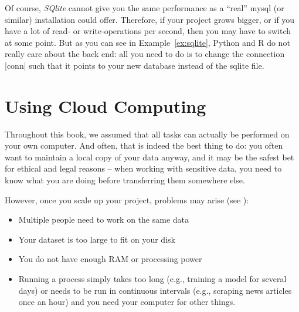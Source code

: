 
Of course, \emph{SQlite} cannot give you the same performance as a ``real'' mysql (or similar) installation could offer. Therefore, if your project grows bigger, or if you have a lot of read-
 or
write-operations per second, then you may have to switch at some
point. But as you can see in Example~\ref{ex:sqlite}, Python and R do not
really care about the back end: all you need to do is to change the
connection |conn| such that it points to your new database instead of
the sqlite file.


%

\section{Using Cloud Computing}
\label{sec:cloudcomputing}

Throughout this book, we assumed that all tasks can actually be
performed on your own computer. And often, that is indeed the best
thing to do: you often want to maintain a local copy of your data
anyway, and it may be the safest bet for ethical and legal reasons --
when working with sensitive data, you need to know what you are doing
before transferring them somewhere else.

However, once you scale up your project, problems may arise (see \cite{Trilling2018b}):
\begin{itemize}
\item Multiple people need to work on the same data
\item Your dataset is too large to fit on your disk
\item You do not have enough RAM or processing power
\item Running a process simply takes too long (e.g., training a model
  for several days) or needs to be run in continuous intervals (e.g.,
  scraping news articles once an hour) and you need your computer for
  other things.
\end{itemize}

